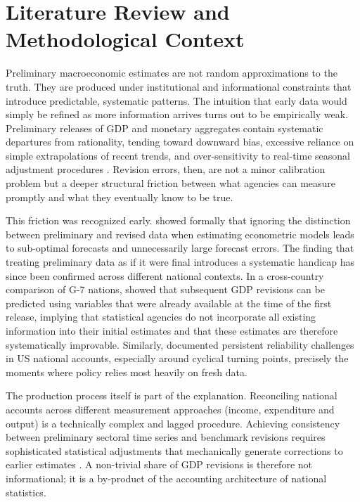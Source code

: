 \documentclass[12pt,a4paper]{article}
\theoremstyle{remark}
\begin{document}
\section{Literature Review and Methodological Context}
\label{sec:lit_review}

Preliminary macroeconomic estimates are not random approximations to the truth. They are produced under institutional and informational constraints that introduce predictable, systematic patterns. The intuition that early data would simply be refined as more information arrives turns out to be empirically weak. Preliminary releases of GDP and monetary aggregates contain systematic departures from rationality, tending toward downward bias, excessive reliance on simple extrapolations of recent trends, and over-sensitivity to real-time seasonal adjustment procedures \citep{mankiw1986, mankiw1984, mork1987, kavajecz1995}. Revision errors, then, are not a minor calibration problem but a deeper structural friction between what agencies can measure promptly and what they eventually know to be true.

This friction was recognized early. \citet{howrey1978} showed formally that ignoring the distinction between preliminary and revised data when estimating econometric models leads to sub-optimal forecasts and unnecessarily large forecast errors. The finding that treating preliminary data as if it were final introduces a systematic handicap has since been confirmed across different national contexts. In a cross-country comparison of G-7 nations, \citet{faust2005} showed that subsequent GDP revisions can be predicted using variables that were already available at the time of the first release, implying that statistical agencies do not incorporate all existing information into their initial estimates and that these estimates are therefore systematically improvable. Similarly, \citet{fixler2002} documented persistent reliability challenges in US national accounts, especially around cyclical turning points, precisely the moments where policy relies most heavily on fresh data.

The production process itself is part of the explanation. Reconciling national accounts across different measurement approaches (income, expenditure and output) is a technically complex and lagged procedure. Achieving consistency between preliminary sectoral time series and benchmark revisions requires sophisticated statistical adjustments that mechanically generate corrections to earlier estimates \citep{chen2018}. A non-trivial share of GDP revisions is therefore not informational; it is a by-product of the accounting architecture of national statistics.
\end{document}
